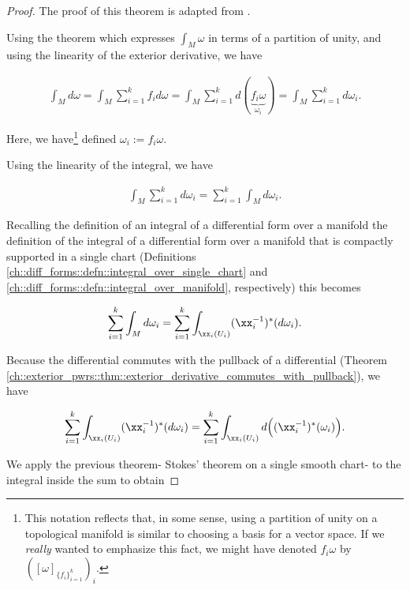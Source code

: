 \begin{proof}
    The proof of this theorem is adapted from \cite[p. 661 - 665]{book::Hubbard}.
    
    Using the theorem which expresses $\int_M \omega$ in terms of a partition of unity, and using the linearity of the exterior derivative, we have
    
    \begin{align*}
        \int_M d \omega = \int_M \sum_{i = 1}^k f_i d \omega = \int_M \sum_{i = 1}^k d (\underbrace{f_i \omega}_{\omega_i}) = \int_M \sum_{i = 1}^k d \omega_i.
    \end{align*}
    
    Here, we have\footnote{This notation reflects that, in some sense, using a partition of unity on a topological manifold is similar to choosing a basis for a vector space. If we \textit{really} wanted to emphasize this fact, we might have denoted $f_i \omega$ by $([\omega]_{\{f_i\}_{i = 1}^k})_i$.} defined $\omega_i := f_i \omega$.
    
    Using the linearity of the integral, we have
    
    \begin{align*}
        \int_M \sum_{i = 1}^k d \omega_i = \sum_{i = 1}^k \int_M d \omega_i.
    \end{align*}
    
    Recalling the definition of an integral of a differential form over a manifold the definition of the integral of a differential form over a manifold that is compactly supported in a single chart (Definitions \ref{ch::diff_forms::defn::integral_over_single_chart} and \ref{ch::diff_forms::defn::integral_over_manifold}, respectively) this becomes
    
    \begin{align*}
        \sum_{i = 1}^k \int_M d \omega_i = \sum_{i = 1}^k \int_{\xx_i(U_i)} (\xx_i^{-1})^*(d \omega_i).
    \end{align*}
    
    Because the differential commutes with the pullback of a differential (Theorem \ref{ch::exterior_pwrs::thm::exterior_derivative_commutes_with_pullback}), we have
    
    \begin{align*}
        \sum_{i = 1}^k \int_{\xx_i(U_i)} (\xx_i^{-1})^*(d \omega_i) = \sum_{i = 1}^k \int_{\xx_i(U_i)} d \Big( (\xx_i^{-1})^*(\omega_i) \Big).
    \end{align*}
    
    We apply the previous theorem- Stokes' theorem on a single smooth chart- to the integral inside the sum to obtain
    

\end{proof}
